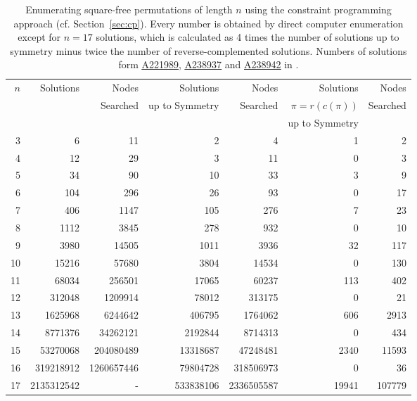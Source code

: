 \documentclass[12pt,reqno]{article}
\newcommand{\seqnum}[1]{\href{http://oeis.org/#1}{\underline{#1}}}
\begin{document}
\begin{table}[H]
\begin{center}
\footnotesize
\begin{tabular}{r|rr|rr|rr}
$n$ & Solutions & Nodes & Solutions  & Nodes & Solutions & Nodes \\ 
 &  & Searched &up to Symmetry & Searched & $\pi=r(c(\pi))$& Searched \\

 &  & & & & up to Symmetry& \\ \hline
 3 &            6 &           11 &            2 &            4 &            1 &            2 \\
 4 &           12 &           29 &            3 &           11 &            0 &            3 \\
 5 &           34 &           90 &           10 &           33 &            3 &            9 \\
 6 &          104 &          296 &           26 &           93 &            0 &           17 \\
 7 &          406 &         1147 &          105 &          276 &            7 &           23 \\
 8 &         1112 &         3845 &          278 &          932 &            0 &           10 \\
 9 &         3980 &        14505 &         1011 &         3936 &           32 &          117 \\
10 &        15216 &        57680 &         3804 &        14534 &            0 &          130 \\
11 &        68034 &       256501 &        17065 &        60237 &          113 &          402 \\
12 &       312048 &      1209914 &        78012 &       313175 &            0 &           21 \\
13 &      1625968 &      6244642 &       406795 &      1764062 &          606 &         2913 \\
14 &      8771376 &     34262121 &      2192844 &      8714313 &            0 &          434 \\
15 &     53270068 &    204080489 &     13318687 &     47248481 &         2340 &        11593 \\
16 &    319218912 &   1260657446 &     79804728 &    318506973 &            0 &           36 \\
17 &  {2135312542}& - &    533838106 &   2336505587 &        19941 &       107779 \\
\end{tabular}
\end{center}
\caption{Enumerating square-free permutations of length $n$ using the constraint programming approach (cf. Section~\ref{sec:cp}). 
Every number is obtained by direct computer enumeration except for $n=17$ solutions, which is calculated as 4 times the number of solutions up to symmetry minus twice the number of reverse-complemented solutions. Numbers of solutions form  \seqnum{A221989}, \seqnum{A238937} and \seqnum{A238942} in \cite{OEIS}.}
\label{tab:squarefree}
\end{table}
\end{document}
